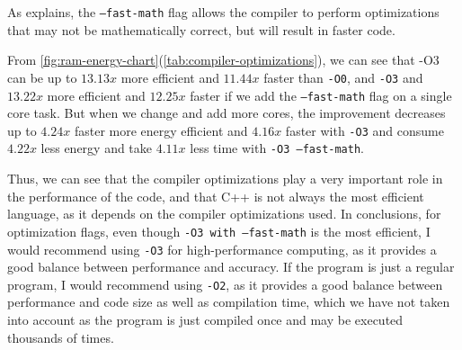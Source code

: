 As \autocite{llvm-fast-math} explains, the \texttt{--fast-math} flag allows the compiler to perform optimizations that may not be mathematically correct, but will result in faster code. 





From \autoref{fig:ram-energy-chart}(\autoref{tab:compiler-optimizations}), we can see that -O3 can be up to $13.13x$ more efficient and $11.44x$ faster than \texttt{-O0}, and \texttt{-O3} and $13.22x$ more efficient and $12.25x$ faster if we add the \texttt{--fast-math} flag on a single core task. But when we change and add more cores, the improvement decreases up to $4.24x$ faster more energy efficient and $4.16x$ faster with \texttt{-O3} and consume $4.22x$ less energy and take $4.11x$ less time with \texttt{-O3 --fast-math}.

Thus, we can see that the compiler optimizations play a very important role in the performance of the code, and that C++ is not always the most efficient language, as it depends on the compiler optimizations used. In conclusions, for optimization flags, even though \texttt{-O3 with --fast-math} is the most efficient, I would recommend using \texttt{-O3} for high-performance computing, as it provides a good balance between performance and accuracy. If the program is just a regular program, I would recommend using \texttt{-O2}, as it provides a good balance between performance and code size as well as compilation time, which we have not taken into account as the program is just compiled once and may be executed thousands of times.